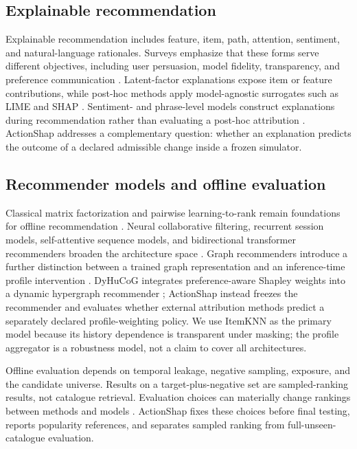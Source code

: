 \documentclass[pdflatex,sn-mathphys-num]{sn-jnl}
\begin{document}
\subsection{Explainable recommendation}
Explainable recommendation includes feature, item, path, attention, sentiment, and natural-language rationales. Surveys emphasize that these forms serve different objectives, including user persuasion, model fidelity, transparency, and preference communication \cite{zhang2020survey}. Latent-factor explanations expose item or feature contributions, while post-hoc methods apply model-agnostic surrogates such as LIME and SHAP \cite{peake2018,nobrega2019,ribeiro2016,lundberg2017}. Sentiment- and phrase-level models construct explanations during recommendation rather than evaluating a post-hoc attribution \cite{zhang2014}. ActionShap addresses a complementary question: whether an explanation predicts the outcome of a declared admissible change inside a frozen simulator.

\subsection{Recommender models and offline evaluation}
Classical matrix factorization and pairwise learning-to-rank remain foundations for offline recommendation \cite{koren2009,joachims2002,rendle2009,burges2005}. Neural collaborative filtering, recurrent session models, self-attentive sequence models, and bidirectional transformer recommenders broaden the architecture space \cite{he2017ncf,hidasi2016gru4rec,kang2018sasrec,sun2019bert4rec}. Graph recommenders introduce a further distinction between a trained graph representation and an inference-time profile intervention \cite{wang2019ngcf,he2020lightgcn}. DyHuCoG integrates preference-aware Shapley weights into a dynamic hypergraph recommender \cite{louhichi2026dyhucog}; ActionShap instead freezes the recommender and evaluates whether external attribution methods predict a separately declared profile-weighting policy. We use ItemKNN as the primary model because its history dependence is transparent under masking; the profile aggregator is a robustness model, not a claim to cover all architectures.

Offline evaluation depends on temporal leakage, negative sampling, exposure, and the candidate universe. Results on a target-plus-negative set are sampled-ranking results, not catalogue retrieval. Evaluation choices can materially change rankings between methods and models \cite{harper2016,bennett2007,saito2021}. ActionShap fixes these choices before final testing, reports popularity references, and separates sampled ranking from full-unseen-catalogue evaluation.
\end{document}
